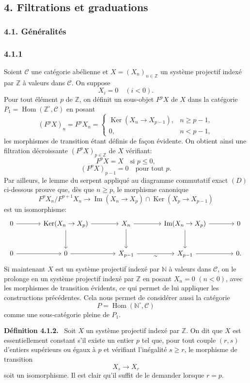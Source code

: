 \documentclass[11pt]{article}
\providecommand{\ZZ}{\mathbb{Z}}
\providecommand{\NN}{\mathbb{N}}
\newenvironment{statement}[1]{\par\medskip\noindent\textbf{#1.}\ }{\par\medskip}
\DeclareMathOperator{\Hom}{Hom}
\providecommand{\Ker}{\operatorname{Ker}}
\providecommand{\Hom}{\operatorname{Hom}}
\providecommand{\NN}{\mathbb N}
\providecommand{\cC}{\mathcal C}
\providecommand{\Im}{\operatorname{Im}}
\providecommand{\Ker}{\operatorname{Ker}}
\renewcommand{\Im}{\operatorname{Im}}
\providecommand{\Ker}{\operatorname{Ker}}
\providecommand{\Im}{\operatorname{Im}}
\begin{document}
\subsection*{4. Filtrations et graduations}
\subsubsection*{4.1. Généralités}
\subsubsection*{4.1.1}
Soient $\cC$ une catégorie abélienne et $X=(X_n)_{n\in\ZZ}$ un système projectif indexé par $\ZZ$ à valeurs dans $\cC$. On suppose
\[
X_i=0\quad(i<0).
\]
Pour tout élément $p$ de $\ZZ$, on définit un sous-objet $F^pX$ de $X$ dans la catégorie $P_1=\Hom(\ZZ^\circ,\cC)$ en posant
\[
(F^pX)_n=F^pX_n=
\begin{cases}
\Ker(X_n\to X_{p-1}),& n\ge p-1,\\
0,& n<p-1,
\end{cases}
\]
les morphismes de transition étant définis de façon évidente. On obtient ainsi une filtration décroissante $(F^pX)_{p\in\ZZ}$ de $X$ vérifiant:
\[
F^pX=X\quad\text{si }p\le0,
\]
\[
(F^pX)_{p-1}=0\quad\text{pour tout }p.
\]
Par ailleurs, le lemme du serpent appliqué au diagramme commutatif exact $(D)$ ci-dessous prouve que, dès que $n\ge p$, le morphisme canonique
\[
F^pX_n/F^{p+1}X_n\longrightarrow \Im(X_n\to X_p)\cap\Ker(X_p\to X_{p-1})
\]
est un isomorphisme:
\[
\begin{tikzcd}[column sep=large,row sep=large]
0 \arrow[r] & \Ker(X_n\to X_p) \arrow[r] \arrow[d] & X_n \arrow[r] \arrow[d] & \Im(X_n\to X_p) \arrow[r] \arrow[d] & 0\\
0 \arrow[r] & 0 \arrow[r] & X_{p-1} \arrow[r,"\sim"'] & X_{p-1} \arrow[r] & 0 .
\end{tikzcd}
\]
Si maintenant $X$ est un système projectif indexé par $\NN$ à valeurs dans $\cC$, on le prolonge en un système projectif indexé par $\ZZ$ en posant $X_n=0$ $(n<0)$, avec les morphismes de transition évidents, ce qui permet de lui appliquer les constructions précédentes. Cela nous permet de considérer aussi la catégorie
\[
P=\Hom(\NN^\circ,\cC)
\]
comme une sous-catégorie pleine de $P_1$.

\begin{statement}{Définition 4.1.2}
Soit $X$ un système projectif indexé par $\ZZ$. On dit que $X$ est essentiellement constant s'il existe un entier $p$ tel que, pour tout couple $(r,s)$ d'entiers supérieurs ou égaux à $p$ et vérifiant l'inégalité $s\ge r$, le morphisme de transition
\[
X_s\longrightarrow X_r
\]
soit un isomorphisme. Il est clair qu'il suffit de le demander lorsque $r=p$.
\end{statement}
\end{document}
